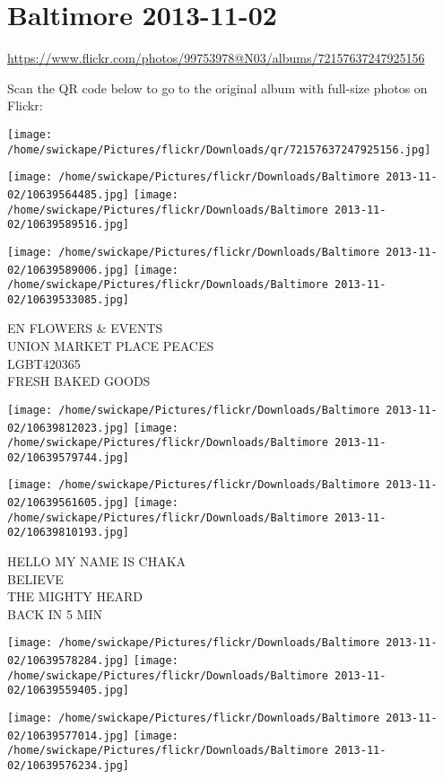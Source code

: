 \documentclass[10pt,letterpaper]{article}
\title{}
\author{}
\date{}
\begin{document}
\section*{Baltimore 2013-11-02}

\url{https://www.flickr.com/photos/99753978@N03/albums/72157637247925156}

Scan the QR code below to go to the original album with full-size photos on Flickr:

\texttt{[image: /home/swickape/Pictures/flickr/Downloads/qr/72157637247925156.jpg]}
\pagebreak

\texttt{[image: /home/swickape/Pictures/flickr/Downloads/Baltimore 2013-11-02/10639564485.jpg]}
\texttt{[image: /home/swickape/Pictures/flickr/Downloads/Baltimore 2013-11-02/10639589516.jpg]}

\texttt{[image: /home/swickape/Pictures/flickr/Downloads/Baltimore 2013-11-02/10639589006.jpg]}
\texttt{[image: /home/swickape/Pictures/flickr/Downloads/Baltimore 2013-11-02/10639533085.jpg]}

EN FLOWERS \& EVENTS\\
UNION MARKET PLACE PEACES\\
LGBT420365\\
FRESH BAKED GOODS
\pagebreak

\texttt{[image: /home/swickape/Pictures/flickr/Downloads/Baltimore 2013-11-02/10639812023.jpg]}
\texttt{[image: /home/swickape/Pictures/flickr/Downloads/Baltimore 2013-11-02/10639579744.jpg]}

\texttt{[image: /home/swickape/Pictures/flickr/Downloads/Baltimore 2013-11-02/10639561605.jpg]}
\texttt{[image: /home/swickape/Pictures/flickr/Downloads/Baltimore 2013-11-02/10639810193.jpg]}

HELLO MY NAME IS CHAKA\\
BELIEVE\\
THE MIGHTY HEARD\\
BACK IN 5 MIN
\pagebreak

\texttt{[image: /home/swickape/Pictures/flickr/Downloads/Baltimore 2013-11-02/10639578284.jpg]}
\texttt{[image: /home/swickape/Pictures/flickr/Downloads/Baltimore 2013-11-02/10639559405.jpg]}

\texttt{[image: /home/swickape/Pictures/flickr/Downloads/Baltimore 2013-11-02/10639577014.jpg]}
\texttt{[image: /home/swickape/Pictures/flickr/Downloads/Baltimore 2013-11-02/10639576234.jpg]}
\end{document}
